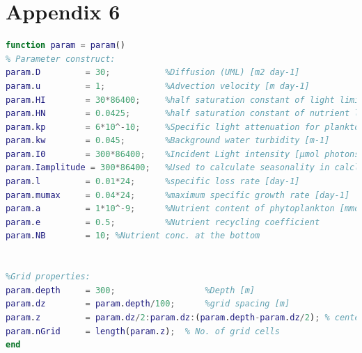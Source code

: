\section{Appendix 6}
\begin{lstlisting}[language=Matlab, caption = param.m - a function collecting all parameter values used in the model]
function param = param()
% Parameter construct:
param.D         = 30;           %Diffusion (UML) [m2 day-1]
param.u         = 1;            %Advection velocity [m day-1]
param.HI        = 30*86400;     %half saturation constant of light limited growth [µmol photons m-2 day-1]
param.HN        = 0.0425;       %half saturation constant of nutrient limited growth [µmol photons m-2 day-1]
param.kp        = 6*10^-10;     %Specific light attenuation for plankton [m2 cell-1];
param.kw        = 0.045;        %Background water turbidity [m-1]
param.I0        = 300*86400;    %Incident Light intensity [µmol photons m-2 day-1]
param.Iamplitude = 300*86400;   %Used to calculate seasonality in calclight.m;
param.l         = 0.01*24;      %specific loss rate [day-1]
param.mumax     = 0.04*24;      %maximum specific growth rate [day-1]
param.a         = 1*10^-9;      %Nutrient content of phytoplankton [mmol nutrient/cell]
param.e         = 0.5;          %Nutrient recycling coefficient
param.NB        = 10; %Nutrient conc. at the bottom


%Grid properties:
param.depth     = 300;                  %Depth [m]
param.dz        = param.depth/100;      %grid spacing [m]
param.z         = param.dz/2:param.dz:(param.depth-param.dz/2); % center of each grid
param.nGrid     = length(param.z);  % No. of grid cells
end
\end{lstlisting}

